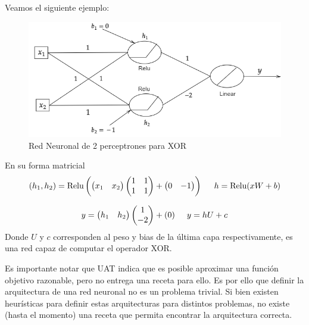 Veamos el siguiente ejemplo: 

\begin{figure}[H]
    \centering
    \includegraphics[scale=.5]{img/cap7_xor}
    \caption{Red Neuronal de 2 perceptrones para XOR}
\end{figure}

En su forma matricial 
$$
(h_1 , h_2) = \text{Relu} \left ( \begin{pmatrix}
x_1 & x_2  
\end{pmatrix} \begin{pmatrix}
1 &1 \\ 
 1 & 1
\end{pmatrix} + \begin{pmatrix}
0 & -1 
\end{pmatrix}\right) \hspace{0.5cm} h = \text{Relu}(xW + b)
$$

$$
y = \begin{pmatrix}
h_1 & h_2 
\end{pmatrix}\begin{pmatrix}
1 \\ 
-2 
\end{pmatrix} + (0) \hspace{0.5cm} y = hU + c
$$
Donde $U$ y $c$ corresponden al peso y bias de la última capa respectivamente, es una red capaz de computar el operador XOR.


Es importante notar que UAT indica que es posible aproximar una función objetivo razonable, pero no entrega una receta para ello. Es por ello que definir la arquitectura de una red neuronal no es un problema trivial. Si bien existen heurísticas para definir estas arquitecturas para distintos problemas, no existe (hasta el momento) una receta que permita encontrar la arquitectura correcta. 

